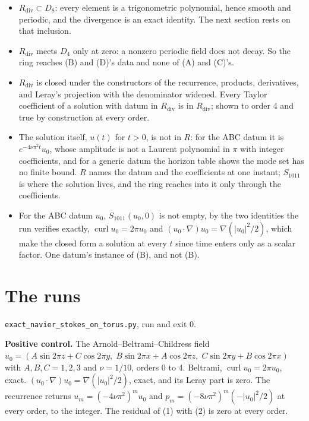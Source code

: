\begin{itemize}
\item $R_{\mathrm{div}} \subset D_8$: every element is a trigonometric polynomial, hence smooth and
  periodic, and the divergence is an exact identity. The next section rests on that
  inclusion.
\item $R_{\mathrm{div}}$ meets $D_4$ only at zero: a nonzero periodic field does not decay. So the
  ring reaches (B) and (D)'s data and none of (A) and (C)'s.
\item $R_{\mathrm{div}}$ is closed under the constructors of the recurrence, products, derivatives,
  and Leray's projection with the denominator widened. Every Taylor coefficient of a solution with
  datum in $R_{\mathrm{div}}$ is in $R_{\mathrm{div}}$; shown to order 4 and true by construction at
  every order.
\item The solution itself, $u(t)$ for $t>0$, is not in $R$: for the ABC datum it is
  $e^{-4\nu\pi^2 t}u_0$, whose amplitude is not a Laurent polynomial in $\pi$ with integer
  coefficients, and for a generic datum the horizon table shows the mode set has no finite bound. $R$
  names the datum and the coefficients at one instant; $S_{1011}$ is where the solution lives, and the
  ring reaches into it only through the coefficients.
\item For the ABC datum $u_0$, $S_{1011}(u_0,0)$ is not empty, by the two identities the run verifies
  exactly, $\operatorname{curl}u_0 = 2\pi u_0$ and $(u_0\cdot\nabla)u_0 = \nabla(|u_0|^2/2)$, which
  make the closed form a solution at every $t$ since time enters only as a scalar factor. One datum's
  instance of (B), and not (B).
\end{itemize}

\section{The runs}

\texttt{exact\_navier\_stokes\_on\_torus.py}, run and exit 0.

\textbf{Positive control.} The Arnold--Beltrami--Childress field
$u_0 = (A\sin 2\pi z + C\cos 2\pi y,\; B\sin 2\pi x + A\cos 2\pi z,\; C\sin 2\pi y + B\cos 2\pi x)$
with $A,B,C = 1,2,3$ and $\nu = 1/10$, orders 0 to 4. Beltrami, $\operatorname{curl}u_0 = 2\pi u_0$,
exact. $(u_0\cdot\nabla)u_0 = \nabla(|u_0|^2/2)$, exact, and its Leray part is zero. The recurrence
returns $u_m = (-4\nu\pi^2)^m u_0$ and $p_m = (-8\nu\pi^2)^m(-|u_0|^2/2)$ at every order, to the
integer. The residual of (1) with (2) is zero at every order.

